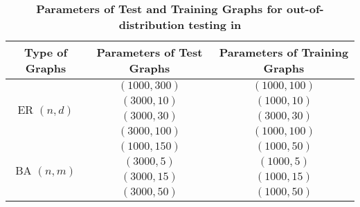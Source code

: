 \begin{table*}[!htbp]
\centering
\small
\caption{\textbf{Parameters of Test and Training Graphs for out-of-distribution testing in \diffuco}}
\label{tab:diffuco-train}

\begin{adjustbox}{width=0.6\textwidth}
\begin{tabular}{|c|c|c|}
\hline
Type of Graphs & Parameters of Test Graphs & Parameters of Training Graphs \\
\hline
\multirow{4}{*}{ER $(n,d)$} 
 & $(1000, 300)$ & $(1000, 100)$ \\
 & $(3000, 10)$  & $(1000, 10)$  \\
 & $(3000, 30)$  & $(3000, 30)$  \\
 & $(3000, 100)$ & $(1000, 100)$ \\
\hline
\multirow{4}{*}{BA $(n,m)$} 
 & $(1000, 150)$ & $(1000, 50)$  \\
 & $(3000, 5)$   & $(1000, 5)$   \\
 & $(3000, 15)$  & $(1000, 15)$  \\
 & $(3000, 50)$  & $(1000, 50)$  \\
\hline
\end{tabular}
\end{adjustbox}
\end{table*}

